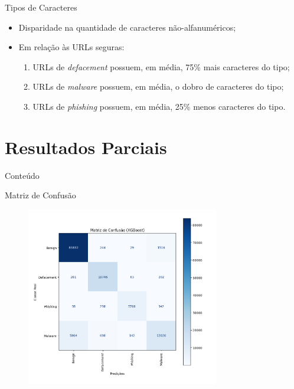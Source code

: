 \documentclass{beamer}
\begin{document}
\begin{frame}{Tipos de Caracteres}

    \begin{itemize}
        \setlength{\itemsep}{10pt}
        \item Disparidade na quantidade de caracteres não-alfanuméricos;
        \item Em relação às URLs seguras:
        \vspace{0.2cm}
        \begin{enumerate}
            \setlength{\itemsep}{10pt}
            \item URLs de \emph{defacement} possuem, em média, 75\% mais caracteres do tipo;
            \item URLs de \emph{malware} possuem, em média, o dobro de caracteres do tipo;
            \item URLs de \emph{phishing} possuem, em média, 25\% menos caracteres do tipo.
        \end{enumerate}
    \end{itemize}
    
\end{frame}

\section{Resultados Parciais}

\begin{frame}{Conteúdo} 
     \tableofcontents[currentsection]
\end{frame}

\begin{frame}{Matriz de Confusão}

    \begin{figure}[H]
        \centering
        \includegraphics[width=0.75\textwidth]{pic/Figure_4.png}
        \label{fig:exampleFig9}
    \end{figure}
    
\end{frame}
\end{document}
